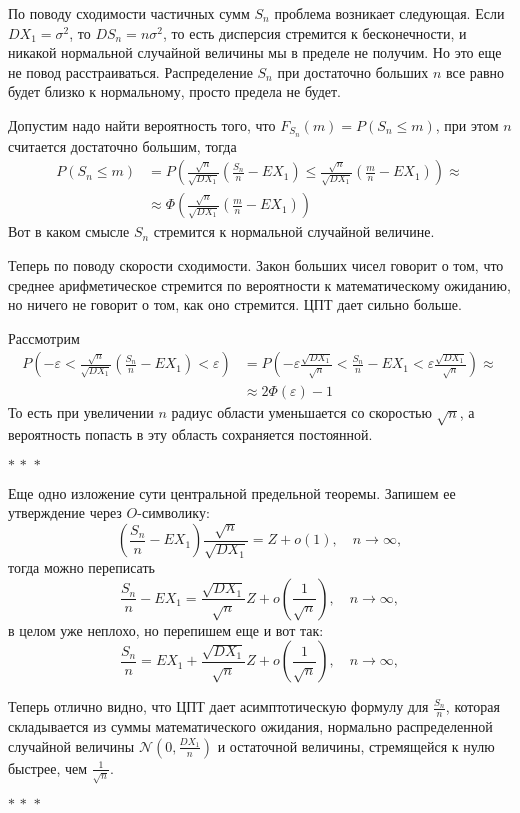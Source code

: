 \documentclass[a4paper,12pt]{article}
\newcommand{\ep}{\varepsilon}
\renewcommand{\le}{\leqslant}
\newcommand{\braces}[1]{\left(#1\right)}
\newcommand{\threestars}{\begin{center}$ {\ast}\,{\ast}\,{\ast} $\end{center}}
\newcounter{th-counter}
\begin{document}
По поводу сходимости частичных сумм $S_n$ проблема возникает следующая. Если $DX_1 = \sigma^2$, то $DS_n = n\sigma^2$, то есть дисперсия стремится к бесконечности, и никакой нормальной случайной величины мы в пределе не получим. Но это еще не повод расстраиваться. Распределение $S_n$ при достаточно больших $n$ все равно будет близко к нормальному, просто предела не будет.

Допустим надо найти вероятность того, что $F_{S_n}(m) = P(S_n \le m)$, при этом $n$ считается достаточно большим, тогда
\begin{align*}
    P(S_n \le m) &= P\braces{\frac{\sqrt{n}}{\sqrt{DX_1}} \braces{\frac{S_n}{n} - EX_1} \le \frac{\sqrt{n}}{\sqrt{DX_1}} \braces{\frac{m}{n} - EX_1}} \approx \\
    & \approx \Phi\braces{\frac{\sqrt{n}}{\sqrt{DX_1}} \braces{\frac{m}{n} - EX_1}}
\end{align*}
Вот в каком смысле $S_n$ стремится к нормальной случайной величине.

Теперь по поводу скорости сходимости. Закон больших чисел говорит о том, что среднее арифметическое стремится по вероятности к математическому ожиданию, но ничего не говорит о том, как оно стремится. ЦПТ дает сильно больше.

Рассмотрим
\begin{align*}
    P\braces{-\ep < \frac{\sqrt{n}}{\sqrt{DX_1}} \braces{\frac{S_n}{n}  - EX_1} < \ep}& = P\braces{-\ep \frac{\sqrt{DX_1}}{\sqrt{n}} < \frac{S_n}{n} - EX_1 < \ep \frac{\sqrt{DX_1}}{\sqrt{n}}} \approx \\
    & \approx 2\Phi(\ep) - 1
\end{align*}
То есть при увеличении $n$ радиус области уменьшается со скоростью $\sqrt{n}$, а вероятность попасть в эту область сохраняется постоянной.

\threestars

Еще одно изложение сути центральной предельной теоремы. Запишем ее утверждение через $O$-символику:
$$\braces{\frac{S_n}{n}-EX_1} \frac{\sqrt{n}}{\sqrt{DX_1}} = Z + o(1), \quad n\rightarrow \infty,$$
тогда можно переписать
$$\frac{S_n}{n}-EX_1 = \frac{\sqrt{DX_1}}{\sqrt{n}} Z + o\braces{\frac{1}{\sqrt{n}}}, \quad n\rightarrow \infty,$$
в целом уже неплохо, но перепишем еще и вот так:
$$\frac{S_n}{n} = EX_1 + \frac{\sqrt{DX_1}}{\sqrt{n}} Z + o\braces{\frac{1}{\sqrt{n}}}, \quad n\rightarrow \infty,$$

Теперь отлично видно, что ЦПТ дает асимптотическую формулу для $\frac{S_n}{n}$, которая складывается из суммы математического ожидания, нормально распределенной случайной величины $\mathcal{N}\braces{0, \frac{DX_1}{n}}$ и остаточной величины, стремящейся к нулю быстрее, чем $\frac{1}{\sqrt{n}}$. 
\threestars
\end{document}
